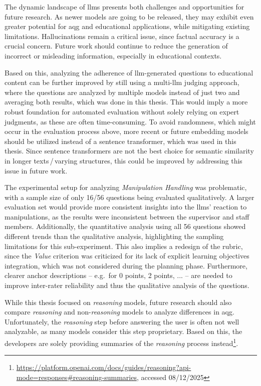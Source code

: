 The dynamic landscape of \acp{llm} presents both challenges and opportunities for future research. As newer models are going to be released, they may exhibit even greater potential for \ac{aqg} and educational applications, while mitigating existing limitations. Hallucinations remain a critical issue, since factual accuracy is a crucial concern. Future work should continue to reduce the generation of incorrect or misleading information, especially in educational contexts.

Based on this, analyzing the adherence of \ac{llm}-generated questions to educational content can be further improved by still using a multi-\ac{llm} judging approach, where the questions are analyzed by multiple models instead of just two and averaging both results, which was done in this thesis. This would imply a more robust foundation for automated evaluation without solely relying on expert judgments, as these are often time-consuming. To avoid randomness, which might occur in the evaluation process above, more recent or future embedding models should be utilized instead of a sentence transformer, which was used in this thesis. Since sentence transformers are not the best choice for semantic similarity in longer texts\,/\,varying structures, this could be improved by addressing this issue in future work.

The experimental setup for analyzing \textit{Manipulation Handling} was problematic, with a sample size of only 16/56 questions being evaluated qualitatively. A larger evaluation set would provide more consistent insights into the \acp{llm}' reaction to manipulations, as the results were inconsistent between the supervisor and staff members. Additionally, the quantitative analysis using all 56 questions showed different trends than the qualitative analysis, highlighting the sampling limitations for this sub-experiment. This also implies a redesign of the rubric, since the \textit{Value} criterion was criticized for its lack of explicit learning objectives integration, which was not considered during the planning phase. Furthermore, clearer anchor descriptions -- e.g.\ for 0 points, 2 points, ... -- are needed to improve inter-rater reliability and thus the qualitative analysis of the questions.

While this thesis focused on \textit{reasoning} models, future research should also compare \textit{reasoning} and non-\textit{reasoning} models to analyze differences in \ac{aqg}. Unfortunately, the \textit{reasoning} step before answering the user is often not well analyzable, as many models consider this step proprietary. Based on this, the developers are solely providing summaries of the \textit{reasoning} process instead\footnote{\url{https://platform.openai.com/docs/guides/reasoning?api-mode=responses\#reasoning-summaries}, accessed 08/12/2025}.

